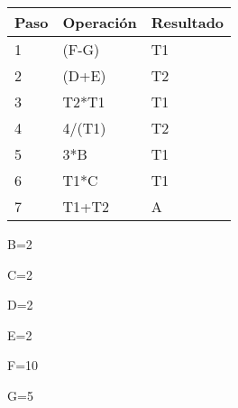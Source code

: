 {\raggedright

\vspace{3pt} \noindent
\begin{tabular}{|p{133pt}|p{133pt}|p{133pt}|}
\hline
\parbox{133pt}{\raggedright 
\textbf{Paso}
} & \parbox{133pt}{\raggedright 
\textbf{Operación}
} & \parbox{133pt}{\raggedright 
\textbf{Resultado}
} \\
\hline
\parbox{133pt}{\raggedright 
1
} & \parbox{133pt}{\raggedright 
(F-G)
} & \parbox{133pt}{\raggedright 
T1
} \\
\hline
\parbox{133pt}{\raggedright 
2
} & \parbox{133pt}{\raggedright 
(D+E)
} & \parbox{133pt}{\raggedright 
T2
} \\
\hline
\parbox{133pt}{\raggedright 
3
} & \parbox{133pt}{\raggedright 
T2*T1
} & \parbox{133pt}{\raggedright 
T1
} \\
\hline
\parbox{133pt}{\raggedright 
4
} & \parbox{133pt}{\raggedright 
4/(T1)
} & \parbox{133pt}{\raggedright 
T2
} \\
\hline
\parbox{133pt}{\raggedright 
5
} & \parbox{133pt}{\raggedright 
3*B
} & \parbox{133pt}{\raggedright 
T1
} \\
\hline
\parbox{133pt}{\raggedright 
6
} & \parbox{133pt}{\raggedright 
T1*C
} & \parbox{133pt}{\raggedright 
T1
} \\
\hline
\parbox{133pt}{\raggedright 
7
} & \parbox{133pt}{\raggedright 
T1+T2
} & \parbox{133pt}{\raggedright 
A
} \\
\hline
\end{tabular}
\vspace{2pt}

}

\begin{center}
B=2
\end{center}

\begin{center}
C=2
\end{center}

\begin{center}
D=2
\end{center}

\begin{center}
E=2
\end{center}

\begin{center}
F=10
\end{center}

\begin{center}
G=5
\end{center}

